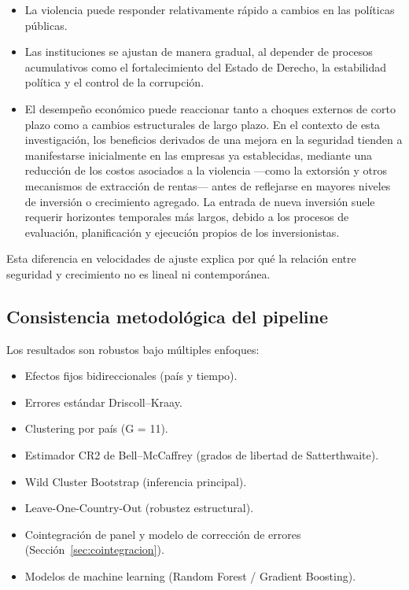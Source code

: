 \documentclass[11pt,a4paper]{article}
\begin{document}
\begin{itemize}
    \item La violencia puede responder relativamente rápido a cambios en las políticas públicas.
    
    \item Las instituciones se ajustan de manera gradual, al depender de procesos acumulativos como el fortalecimiento del Estado de Derecho, la estabilidad política y el control de la corrupción.
    
    \item El desempeño económico puede reaccionar tanto a choques externos de corto plazo como a cambios estructurales de largo plazo. En el contexto de esta investigación, los beneficios derivados de una mejora en la seguridad tienden a manifestarse inicialmente en las empresas ya establecidas, mediante una reducción de los costos asociados a la violencia ---como la extorsión y otros mecanismos de extracción de rentas--- antes de reflejarse en mayores niveles de inversión o crecimiento agregado. La entrada de nueva inversión suele requerir horizontes temporales más largos, debido a los procesos de evaluación, planificación y ejecución propios de los inversionistas.
\end{itemize}

Esta diferencia en velocidades de ajuste explica por qué la relación entre seguridad y crecimiento no es lineal ni contemporánea.

\subsection{Consistencia metodológica del pipeline}

Los resultados son robustos bajo múltiples enfoques:

\begin{itemize}
\item Efectos fijos bidireccionales (país y tiempo).
\item Errores estándar Driscoll--Kraay.
\item Clustering por país (G = 11).
\item Estimador CR2 de Bell--McCaffrey (grados de libertad de Satterthwaite).
\item Wild Cluster Bootstrap (inferencia principal).
\item Leave-One-Country-Out (robustez estructural).
\item Cointegración de panel y modelo de corrección de errores (Sección~\ref{sec:cointegracion}).
\item Modelos de machine learning (Random Forest / Gradient Boosting).
\end{itemize}
\end{document}

